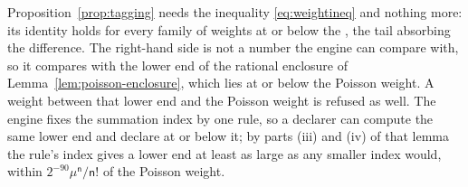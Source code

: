 
Proposition~\ref{prop:tagging} needs the inequality \eqref{eq:weightineq} and
nothing more: its identity holds for every family of weights at or below the
, the tail absorbing the difference. The
right-hand side is not a number the engine can compare with, so it compares
with the lower end of the rational enclosure of
Lemma~\ref{lem:poisson-enclosure}, which lies at or below the Poisson weight.
A weight between that lower end and the Poisson weight is refused as well. The
engine fixes the summation index by one rule, so a declarer can compute the
same lower end and declare at or below it; by parts (iii) and (iv) of that
lemma the rule's index gives a lower end at least as large as any smaller
index would, within $2^{-90}\mu^{\mathsf{n}}/\mathsf{n}!$ of the Poisson
weight.

